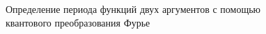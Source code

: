 \begin{figure}
\centering



\caption{ Определение периода функций двух аргументов с помощью квантового
  преобразования Фурье}
\label{figQuantCompQuantPeriodFinding2}
\end{figure}
